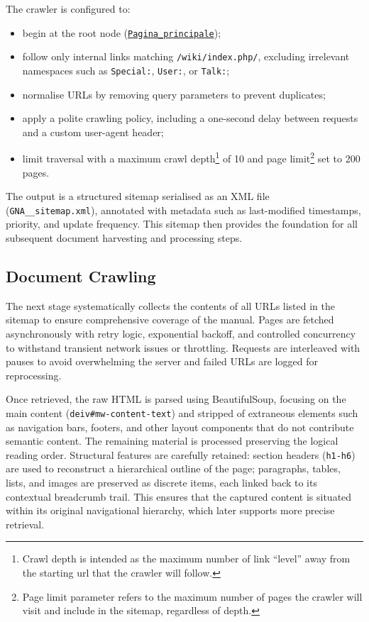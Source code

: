 \begin{spacing}{1.5}
The crawler is configured to:
\begin{itemize}
      \item begin at the root node (\texttt{\href{https://web.archive.org/web/20250803092155/https://gna.cultura.gov.it/wiki/index.php/Pagina_principale}{Pagina\_principale}}\nocite{noauthor_wiki_2025});
      \item follow only internal links matching \texttt{/wiki/index.php/}, excluding irrelevant namespaces such as \texttt{Special:}, \texttt{User:}, or \texttt{Talk:};
      \item normalise URLs by removing query parameters to prevent duplicates;
      \item apply a polite crawling policy, including a one-second delay between requests and a custom user-agent header;
      \item limit traversal with a maximum crawl depth\footnote{Crawl depth is intended as the maximum number of link ``level'' away from the starting url that the crawler will follow.} of 10 and page limit\footnote{Page limit parameter refers to the maximum number of pages the crawler will visit and include in the sitemap, regardless of depth.} set to 200 pages.
\end{itemize}

The output is a structured sitemap serialised as an XML file (\texttt{GNA\_\_sitemap.xml}), annotated with metadata such as last-modified timestamps, priority, and update frequency. This sitemap then provides the foundation for all subsequent document harvesting and processing steps.

\subsection{Document Crawling}
The next stage systematically collects the contents of all URLs listed in the sitemap to ensure comprehensive coverage of the manual. Pages are fetched asynchronously with retry logic, exponential backoff, and controlled concurrency to withstand transient network issues or throttling. Requests are interleaved with pauses to avoid overwhelming the server and failed URLs are logged for reprocessing.

Once retrieved, the raw HTML is parsed using BeautifulSoup, focusing on the main content (\texttt{deiv\#mw-content-text}) and stripped of extraneous elements such as navigation bars, footers, and other layout components that do not contribute semantic content. The remaining material is processed preserving the logical reading order. Structural features are carefully retained: section headers (\texttt{h1-h6}) are used to reconstruct a hierarchical outline of the page; paragraphs, tables, lists, and images are preserved as discrete items, each linked back to its contextual breadcrumb trail. This ensures that the captured content is situated within its original navigational hierarchy, which later supports more precise retrieval.


\end{spacing}
